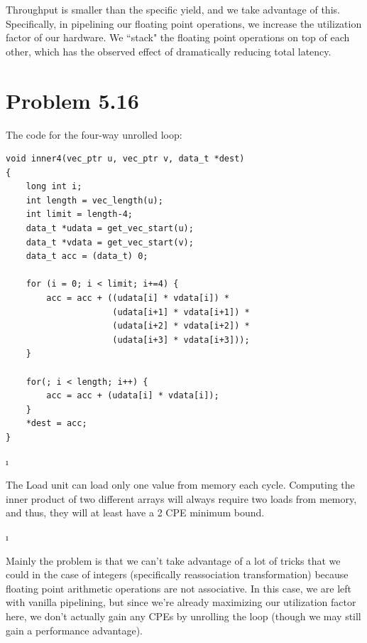 \documentclass[fleqn]{article}
\begin{document}
\begin{solution}
Throughput is smaller than the specific yield, and we take advantage of this. Specifically, in pipelining our floating point operations, we increase the utilization factor of our hardware. We ``stack" the floating point operations on top of each other, which has the observed effect of dramatically reducing total latency.
\end{solution}

\ene

\section{Problem 5.16}

The code for the four-way unrolled loop:

\begin{solution}
\begin{verbatim}
void inner4(vec_ptr u, vec_ptr v, data_t *dest)
{
    long int i;
    int length = vec_length(u);
    int limit = length-4;
    data_t *udata = get_vec_start(u);
    data_t *vdata = get_vec_start(v);
    data_t acc = (data_t) 0;
    
    for (i = 0; i < limit; i+=4) {
        acc = acc + ((udata[i] * vdata[i]) *
                     (udata[i+1] * vdata[i+1]) *
                     (udata[i+2] * vdata[i+2]) *
                     (udata[i+3] * vdata[i+3]));
    }
    
    for(; i < length; i++) {
        acc = acc + (udata[i] * vdata[i]);
    }
    *dest = acc;
}
\end{verbatim}
\end{solution}

\bee

\i
\begin{solution} 
The Load unit can load only one value from memory each cycle. Computing the inner product of two different arrays will always require two loads from memory, and thus, they will at least have a 2 CPE minimum bound.
\end{solution}

\i
\begin{solution} 
Mainly the problem is that we can't take advantage of a lot of tricks that we could in the case of integers (specifically reassociation transformation) because floating point arithmetic operations are not associative. In this case, we are left with vanilla pipelining, but since we're already maximizing our utilization factor here, we don't actually gain any CPEs by unrolling the loop (though we may still gain a performance advantage).
\end{solution}
\end{document}
